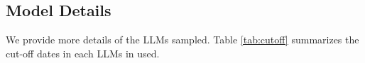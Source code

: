 


\subsection{Model Details}\label{subsec:model_details}
We provide more details of the LLMs sampled. Table \ref{tab:cutoff} summarizes the cut-off dates in each LLMs in used.

